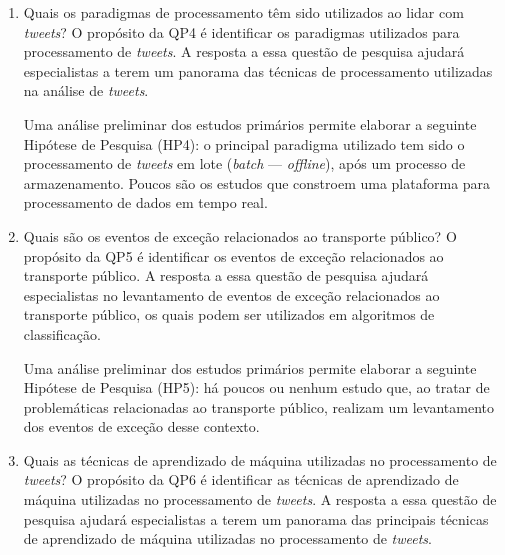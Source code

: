 \documentclass[
	12pt,				%
	oneside,			%
	a4paper,			%
	english,			%
	brazil				%
	]{abntex2ppgsi}
\begin{document}
{{{\begin{enumerate}
Uma análise preliminar dos estudos primários permite elaborar a seguinte Hipótese de Pesquisa (HP3): \textit{${F_1}$ score} é a principal técnica utilizada para validação de classificação binária.\newline

\item Quais os paradigmas de processamento têm sido utilizados ao lidar com \textit{tweets}?
\label{item:4} \newline \newline
O propósito da QP4 é identificar os paradigmas utilizados para processamento de \textit{tweets}. A resposta a essa questão de pesquisa ajudará especialistas a terem um panorama das técnicas de processamento utilizadas na análise de \textit{tweets}. \newline

Uma análise preliminar dos estudos primários permite elaborar a seguinte Hipótese de Pesquisa (HP4): o principal paradigma utilizado tem sido o processamento de \textit{tweets} em lote (\textit{batch} --- \textit{offline}), após um processo de armazenamento. Poucos são os estudos que constroem uma plataforma para processamento de dados em tempo real. \newline

\item Quais são os eventos de exceção relacionados ao transporte público?
\label{item:5} \newline \newline
O propósito da QP5 é identificar os eventos de exceção relacionados ao transporte público. A resposta a essa questão de pesquisa ajudará especialistas no levantamento de eventos de exceção relacionados ao transporte público, os quais podem ser utilizados em algoritmos de classificação.\newline

Uma análise preliminar dos estudos primários permite elaborar a seguinte Hipótese de Pesquisa (HP5): há poucos ou nenhum estudo que, ao tratar de problemáticas relacionadas ao transporte público, realizam um levantamento dos eventos de exceção desse contexto.\newline

\item Quais as técnicas de aprendizado de máquina utilizadas no processamento de \textit{tweets}?
\label{item:6} \newline \newline
O propósito da QP6 é identificar as técnicas de aprendizado de máquina utilizadas no processamento de \textit{tweets}. A resposta a essa questão de pesquisa ajudará especialistas a terem um panorama das principais técnicas de aprendizado de máquina utilizadas no processamento de \textit{tweets}. \newline


\end{enumerate}}}}
\end{document}
